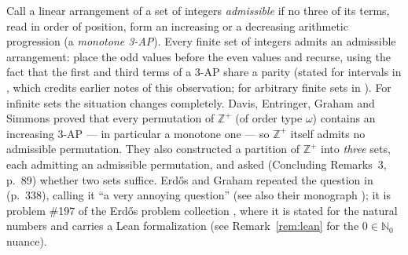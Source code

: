 \documentclass[11pt]{article}
\theoremstyle{definition}
\newcommand{\Z}{\mathbb{Z}}
\newcommand{\N}{\mathbb{N}}
\begin{document}
Call a linear arrangement of a set of integers \emph{admissible} if no three
of its terms, read in order of position, form an increasing or a decreasing
arithmetic progression (a \emph{monotone 3-AP}). Every finite set of integers
admits an admissible arrangement: place the odd values before the even values
and recurse, using the fact that the first and third terms of a 3-AP share a
parity (stated for intervals in \cite{DEGS77}, which credits earlier notes of
this observation; for arbitrary finite sets in \cite{ErGr79}). For infinite sets the situation changes completely.
Davis, Entringer, Graham and Simmons \cite{DEGS77} proved that every
permutation of $\Z^+$ (of order type $\omega$) contains an increasing 3-AP ---
in particular a monotone one --- so $\Z^+$ itself admits no admissible
permutation. They also constructed a partition of $\Z^+$ into \emph{three}
sets, each admitting an admissible permutation, and asked (Concluding
Remarks~3, p.~89) whether two sets suffice. Erd\H{o}s and Graham repeated the
question in \cite{ErGr79} (p.~338), calling it ``a very annoying question''
(see also their monograph \cite{ErGr80}); it is problem \#197 of the
Erd\H{o}s problem collection \cite{Bl}, where it is stated for the natural
numbers and carries a Lean formalization \cite{FC} (see
Remark~\ref{rem:lean} for the $0 \in \N_0$ nuance).
\end{document}
